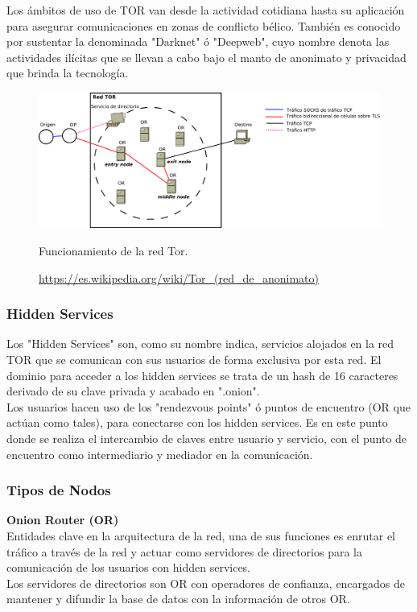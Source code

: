 Los ámbitos de uso de TOR van desde la actividad cotidiana hasta su aplicación para asegurar comunicaciones en zonas de conflicto bélico. También es conocido por sustentar la denominada "Darknet" ó "Deepweb", cuyo nombre denota las actividades ilícitas que se llevan a cabo bajo el manto de anonimato y privacidad que brinda la tecnología. \\

\begin{figure}[H]
	\centering
	\includegraphics[width=\textwidth]{imagenes/funcionamiento_tor}
	\caption{Funcionamiento de la red Tor.}
	\caption*{\small \url {https://es.wikipedia.org/wiki/Tor_(red_de_anonimato)}}
	\label{fig:redtor}
\end{figure}

\subsubsection {Hidden Services}

Los "Hidden Services" son, como su nombre indica, servicios alojados en la red TOR que se comunican con sus usuarios de forma exclusiva por esta red. El dominio para acceder a los hidden services se trata de un hash de 16 caracteres derivado de su clave privada y acabado en ".onion". \\

Los usuarios hacen uso de los "rendezvous points" ó puntos de encuentro (OR que actúan como tales), para conectarse con los hidden services. Es en este punto donde se realiza el intercambio de claves entre usuario y servicio, con el punto de encuentro como intermediario y mediador en la comunicación. \\ 


\subsubsection {Tipos de Nodos}

\textbf {Onion Router (OR)} \\
Entidades clave en la arquitectura de la red, una de sus funciones es enrutar el tráfico a través de la red y actuar como servidores de directorios para la comunicación de los usuarios con hidden services. \\ Los servidores de directorios son OR con operadores de confianza, encargados de mantener y difundir la base de datos con la información de otros OR. \\

